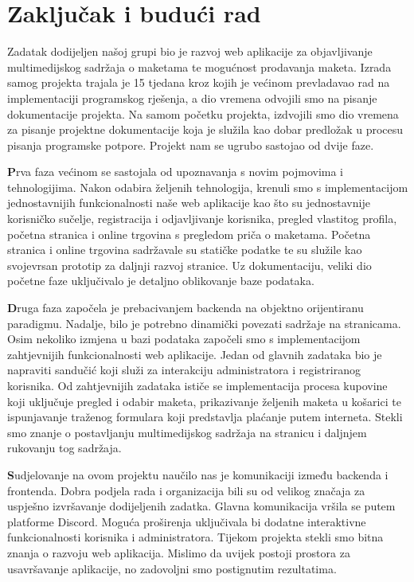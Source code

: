 \chapter{Zaključak i budući rad}
		
		Zadatak dodijeljen našoj grupi bio je razvoj web aplikacije za objavljivanje multimedijskog sadržaja o maketama te mogućnost prodavanja maketa. Izrada samog projekta trajala je 15 tjedana kroz kojih je većinom prevladavao rad na implementaciji programskog rješenja, a dio vremena odvojili smo na pisanje dokumentacije projekta. Na samom početku projekta, izdvojili smo dio vremena za pisanje projektne dokumentacije koja je služila kao dobar predložak u procesu pisanja programske potpore. Projekt nam se ugrubo sastojao od dvije faze.
		
		\textbf	Prva faza većinom se sastojala od upoznavanja s novim pojmovima i tehnologijima. Nakon odabira željenih tehnologija, krenuli smo s implementacijom jednostavnijih funkcionalnosti naše web aplikacije kao što su jednostavnije korisničko sučelje, registracija i odjavljivanje korisnika, pregled vlastitog profila, početna stranica i online trgovina s pregledom priča o maketama. Početna stranica i online trgovina sadržavale su statičke podatke te su služile kao svojevrsan prototip za daljnji razvoj stranice. Uz dokumentaciju, veliki dio početne faze uključivalo je detaljno oblikovanje baze podataka.
		
		\textbf Druga faza započela je prebacivanjem backenda na objektno orijentiranu paradigmu. Nadalje, bilo je potrebno dinamički povezati sadržaje na stranicama. Osim nekoliko izmjena u bazi podataka započeli smo s implementacijom zahtjevnijih funkcionalnosti web aplikacije. Jedan od glavnih zadataka bio je napraviti sandučić koji služi za interakciju administratora i registriranog korisnika. Od zahtjevnijih zadataka ističe se implementacija procesa kupovine koji uključuje pregled i odabir maketa, prikazivanje željenih maketa u košarici te ispunjavanje traženog formulara koji predstavlja plaćanje putem interneta. Stekli smo znanje o postavljanju multimedijskog sadržaja na stranicu i daljnjem rukovanju tog sadržaja.
		
		\textbf Sudjelovanje na ovom projektu naučilo nas je komunikaciji između backenda i frontenda. Dobra podjela rada i organizacija bili su od velikog značaja za uspješno izvršavanje dodijeljenih zadatka. Glavna komunikacija vršila se putem platforme Discord. Moguća proširenja uključivala bi dodatne interaktivne funkcionalnosti korisnika i administratora. Tijekom projekta stekli smo bitna znanja o razvoju web aplikacija. Mislimo da uvijek postoji prostora za usavršavanje aplikacije, no zadovoljni smo postignutim rezultatima.
		
		
		\eject 